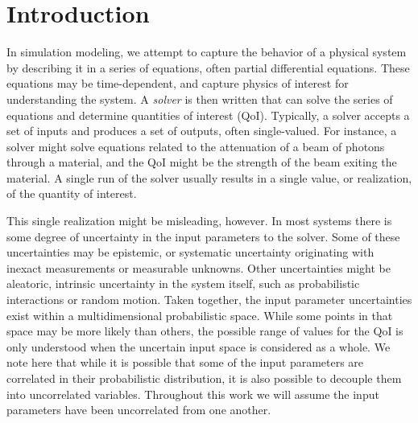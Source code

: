 
\chapter{Introduction} %

\label{ch:intro} %




In simulation modeling, we attempt to capture the behavior of a physical system by describing it in a series
of equations, often partial differential equations.  These equations may be time-dependent, and capture
physics of interest for understanding the system.  A \emph{solver} is then written that can solve the series
of equations and determine quantities of interest (QoI).  Typically, a solver accepts a set of inputs and
produces a set of outputs, often single-valued.  For instance, a solver might solve equations related to the
attenuation of a beam of photons through a material, and the QoI might be the strength of the beam exiting the
material.  A single run of the solver usually results in a single value, or realization, of the quantity of
interest.

This single realization might be misleading, however.  In most systems there is some degree of uncertainty in
the input parameters to the solver.  Some of these uncertainties may be epistemic, or systematic uncertainty
originating with inexact measurements or measurable unknowns.  Other uncertainties might be aleatoric,
intrinsic uncertainty in the system itself, such as probabilistic interactions or random motion.  Taken
together, the input parameter uncertainties exist within a multidimensional probabilistic space.  While some
points in that space may be more likely than others, the possible range of values for the QoI is only
understood when the uncertain input space is considered as a whole.  We note here that while it is possible
that some of the input parameters are correlated in their probabilistic distribution, it is also possible to
decouple them into uncorrelated variables.  Throughout this work we will assume the input parameters have been
uncorrelated from one another.

